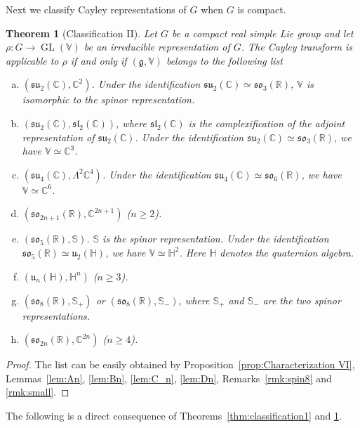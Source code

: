 \documentclass[11pt,reqno]{amsart}
\DeclareMathOperator{\GL}{GL}
\newtheorem{theorem}{Theorem}[section]
\newcommand{\RR}{\mathbb{R}} %
\newcommand{\CC}{\mathbb{C}} %
\newcommand{\HH}{\mathbb{H}} %
\begin{document}
Next we classify Cayley representations of $G$ when $G$ is compact.
\begin{theorem}[Classification II]\label{thm:classification2}
Let $G$ be a compact real simple Lie group and let $\rho: G \to \GL(\mathbb{V})$ be an irreducible representation of $G$.  The Cayley transform is applicable to $\rho$ if and only if $(\mathfrak{g},  \mathbb{V})$ belongs to the following list 
\begin{enumerate}[(a)]
    \item $(\mathfrak{su}_2(\CC),  \mathbb{C}^2)$.  Under the identification $\mathfrak{su}_2(\CC) \simeq \mathfrak{so}_3(\RR)$,  $\mathbb{V}$ is isomorphic to the spinor representation. 
    \item $(\mathfrak{su}_2(\mathbb{C}), \mathfrak{sl}_2(\CC))$,  where $\mathfrak{sl}_2(\CC)$ is the complexification of the adjoint representation of $\mathfrak{su}_{2}(\CC)$.  Under the identification $\mathfrak{su}_2(\CC) \simeq \mathfrak{so}_3(\RR)$,  we have $\mathbb{V} \simeq \mathbb{C}^3$.
    \item $(\mathfrak{su}_4(\CC), \mathsf{\Lambda}^2 \mathbb{C}^4)$.  Under the identification $\mathfrak{su}_4(\mathbb{C}) \simeq \mathfrak{so}_6(\mathbb{R})$,  we have $\mathbb{V}\simeq \mathbb{C}^6$.
    \item $(\mathfrak{so}_{2n+1}(\RR),  \mathbb{C}^{2n+1})$ ($n \ge 2$).
    \item $(\mathfrak{so}_5(\mathbb{R}),  \mathbb{S})$. $\mathbb{S}$ is the spinor representation.  Under the identification $\mathfrak{so}_5(\RR) \simeq \mathfrak{u}_2(\HH)$,  we have $\mathbb{V} \simeq \mathbb{H}^2$. Here $\mathbb{H}$ denotes the quaternion algebra.
    \item $(\mathfrak{u}_{n}(\HH),  \mathbb{H}^{n})$ ($n \ge 3$). 
    \item $(\mathfrak{so}_{8}(\RR),  \mathbb{S}_+)$ or $(\mathfrak{so}_{8}(\RR),  \mathbb{S}_-)$,  where $\mathbb{S}_+$ and $\mathbb{S}_-$ are the two spinor representations. 
    \item $(\mathfrak{so}_{2n}(\RR),  \mathbb{C}^{2n} )$ ($n \ge 4$).
\end{enumerate}
\end{theorem}
\begin{proof}
The list can be easily obtained by Proposition~\ref{prop:Characterization VI},  Lemmas~\ref{lem:An},  \ref{lem:Bn},  \ref{lem:C_n},  \ref{lem:Dn},  Remarks~\ref{rmk:spin8} and \ref{rmk:small}.
\end{proof}
The following is a direct consequence of Theorems~\ref{thm:classification1} and \ref{thm:classification2}.
\end{document}
